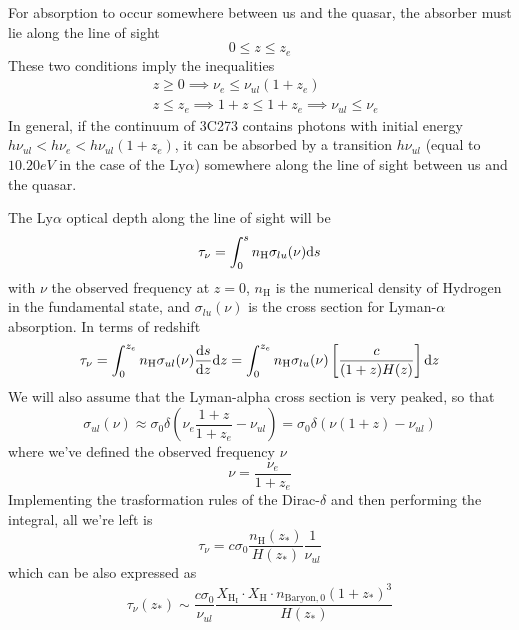 For absorption to occur somewhere between us and the quasar, the absorber must lie along the line of sight
\begin{equation*}
    0 \leq z \leq z_{e}
\end{equation*}
These two conditions imply the inequalities
\begin{align*}
    &z \geq 0 \implies \nu_{e} \leq \nu_{ul}(1+z_{e})\\
    &z \leq z_{e}\implies 1+z \leq 1+z_{e}\implies \nu_{ul}\leq \nu_{e}
\end{align*}
In general, if the continuum of 3C273 contains photons with initial energy $h\nu_{ul}<h\nu_{e}<h\nu_{ul}(1+z_{e})$, it can be absorbed by a transition $h\nu_{ul}$ (equal to $10.20\unit{eV}$ in the case of the Ly$\alpha$) somewhere along the line of sight between us and the quasar.
\par The Ly$\alpha$ optical depth along the line of sight will be
\begin{equation*}
    \tau_{\nu} = \int_{0}^{s}n_{\text{H}}\sigma_{lu}(\nu)\text{d}s
\end{equation*}
with $\nu$ the observed frequency at $z=0$, $n_{\text{H}}$ is the numerical density of Hydrogen in the fundamental state, and $\sigma_{lu}(\nu)$ is the cross section for Lyman-$\alpha$ absorption. In terms of redshift
\begin{equation*}
    \tau_{\nu} = \int_{0}^{z_{e}}n_{\text{H}}\sigma_{ul}(\nu)\frac{\text{d}s}{\text{d}z}\text{d}z = \int_{0}^{z_{e}}n_{\text{H}}\sigma_{lu}(\nu)\left[\frac{c}{(1+z)H(z)}\right]\text{d}z
\end{equation*}
We will also assume that the Lyman-alpha cross section is very peaked, so that
\begin{equation*}
    \sigma_{ul}(\nu) \approx \sigma_{0}\delta\left(\nu_{e}\frac{1+z}{1+z_{e}}-\nu_{ul}\right) = \sigma_{0}\delta(\nu(1+z)-\nu_{ul})
\end{equation*}
where we've defined the observed frequency $\nu$
\begin{equation*}
    \nu = \frac{\nu_{e}}{1+z_{e}}
\end{equation*}
Implementing the trasformation rules of the Dirac-$\delta$ and then performing the integral, all we're left is 
\begin{equation*}
    \tau_{\nu} = c\sigma_{0}\frac{n_\text{H}(z_{*})}{H(z_{*})}\frac{1}{\nu_{ul}}
\end{equation*}
which can be also expressed as 
\begin{equation*}
    \tau_{\nu}(z_{*}) \sim \frac{c\sigma_{0}}{\nu_{ul}}\frac{X_{\text{H}_{\text{I}}}\cdot X_{\text{H}}\cdot n_{\text{Baryon},0}(1+z_{*})^{3}}{H(z_{*})}
\end{equation*}
